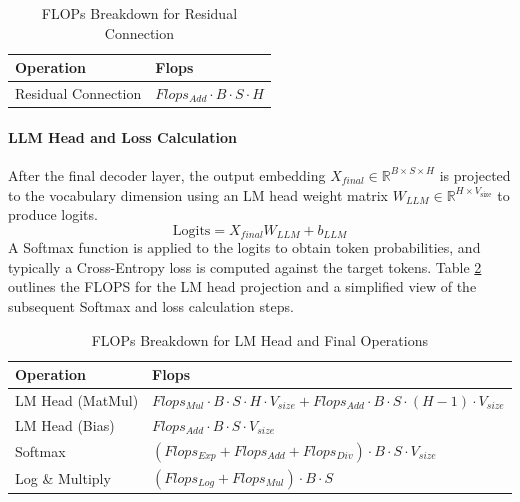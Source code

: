\documentclass{article}
\begin{document}
\begin{table}[!th]
\renewcommand{\arraystretch}{1.4}
\centering
\setlength{\tabcolsep}{8pt} %
\begin{tabular}{ll}
    \toprule
    \textbf{Operation}           & \textbf{Flops} \\
    \midrule
    Residual Connection & $Flops_{Add} \cdot B \cdot S \cdot H$ \\
    \bottomrule
\end{tabular}
\caption{FLOPs Breakdown for Residual Connection}
\label{tab:residual_flops}
\end{table}


\paragraph{LLM Head and Loss Calculation}
After the final decoder layer, the output embedding $X_{final} \in \mathbb{R}^{B \times S \times H}$ is projected to the vocabulary dimension using an LM head weight matrix $W_{LLM} \in \mathbb{R}^{H \times V_{\text{size}}}$ to produce logits.
\begin{equation}
    \text{Logits} = X_{final} W_{LLM} + b_{LLM}
\end{equation}
A Softmax function is applied to the logits to obtain token probabilities, and typically a Cross-Entropy loss is computed against the target tokens. Table \ref{tab:lm_head_flops} outlines the FLOPS for the LM head projection and a simplified view of the subsequent Softmax and loss calculation steps.

\begin{table}[!th]
\renewcommand{\arraystretch}{1.4}
\centering
\setlength{\tabcolsep}{8pt} %
\begin{tabular}{ll}
    \toprule
    \textbf{Operation}        & \textbf{Flops} \\
    \midrule
    LM Head (MatMul) & $Flops_{Mul} \cdot B \cdot S \cdot H \cdot V_{size} + Flops_{Add} \cdot B \cdot S \cdot (H - 1) \cdot V_{size}$ \\
    LM Head (Bias)   & $Flops_{Add} \cdot B \cdot S \cdot V_{size}$ \\
    Softmax          & $(Flops_{Exp} + Flops_{Add} + Flops_{Div}) \cdot B \cdot S \cdot V_{size}$ \\
    Log \& Multiply    & $(Flops_{Log} + Flops_{Mul}) \cdot B \cdot S$ \\ %
    \bottomrule
\end{tabular}
\caption{FLOPs Breakdown for LM Head and Final Operations}
\label{tab:lm_head_flops}
\end{table}
\end{document}
